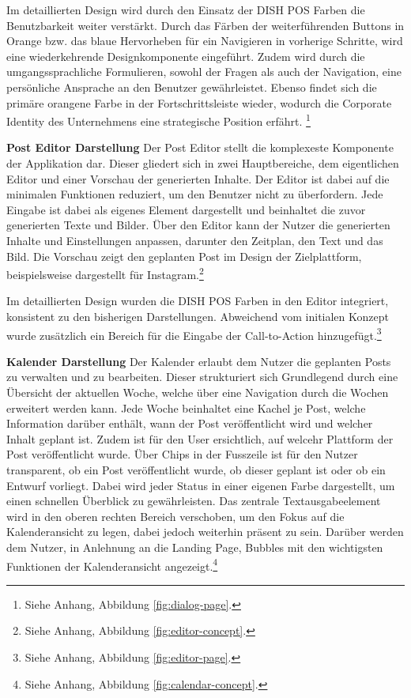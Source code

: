Im detaillierten Design wird durch den Einsatz der DISH POS Farben die Benutzbarkeit weiter verstärkt.
Durch das Färben der weiterführenden Buttons in Orange bzw. das blaue Hervorheben für ein Navigieren in vorherige Schritte, wird eine wiederkehrende Designkomponente eingeführt.
Zudem wird durch die umgangssprachliche Formulieren, sowohl der Fragen als auch der Navigation, eine persönliche Ansprache an den Benutzer gewährleistet.
Ebenso findet sich die primäre orangene Farbe in der Fortschrittsleiste wieder, wodurch die Corporate Identity des Unternehmens eine strategische Position erfährt. \footnote{Siehe Anhang, Abbildung \ref{fig:dialog-page}.}

\textbf{Post Editor Darstellung}\newline
Der Post Editor stellt die komplexeste Komponente der Applikation dar.
Dieser gliedert sich in zwei Hauptbereiche, dem eigentlichen Editor und einer Vorschau der generierten Inhalte.
Der Editor ist dabei auf die minimalen Funktionen reduziert, um den Benutzer nicht zu überfordern.
Jede Eingabe ist dabei als eigenes Element dargestellt und beinhaltet die zuvor generierten Texte und Bilder.
Über den Editor kann der Nutzer die generierten Inhalte und Einstellungen anpassen, darunter den Zeitplan, den Text und das Bild.
Die Vorschau zeigt den geplanten Post im Design der Zielplattform, beispielsweise dargestellt für Instagram.\footnote{Siehe Anhang, Abbildung \ref{fig:editor-concept}.}

Im detaillierten Design wurden die DISH POS Farben in den Editor integriert, konsistent zu den bisherigen Darstellungen.
Abweichend vom initialen Konzept wurde zusätzlich ein Bereich für die Eingabe der Call-to-Action hinzugefügt.\footnote{Siehe Anhang, Abbildung \ref{fig:editor-page}.}

\textbf{Kalender Darstellung}\newline
Der Kalender erlaubt dem Nutzer die geplanten Posts zu verwalten und zu bearbeiten.
Dieser strukturiert sich Grundlegend durch eine Übersicht der aktuellen Woche, welche über eine Navigation durch die Wochen erweitert werden kann.
Jede Woche beinhaltet eine Kachel je Post, welche Information darüber enthält, wann der Post veröffentlicht wird und welcher Inhalt geplant ist.
Zudem ist für den User ersichtlich, auf welcehr Plattform der Post veröffentlicht wurde.
Über Chips in der Fusszeile ist für den Nutzer transparent, ob ein Post veröffentlicht wurde, ob dieser geplant ist oder ob ein Entwurf vorliegt.
Dabei wird jeder Status in einer eigenen Farbe dargestellt, um einen schnellen Überblick zu gewährleisten.
Das zentrale Textausgabeelement wird in den oberen rechten Bereich verschoben, um den Fokus auf die Kalenderansicht zu legen, dabei jedoch weiterhin präsent zu sein.
Darüber werden dem Nutzer, in Anlehnung an die Landing Page, Bubbles mit den wichtigsten Funktionen der Kalenderansicht angezeigt.\footnote{Siehe Anhang, Abbildung \ref{fig:calendar-concept}.}

